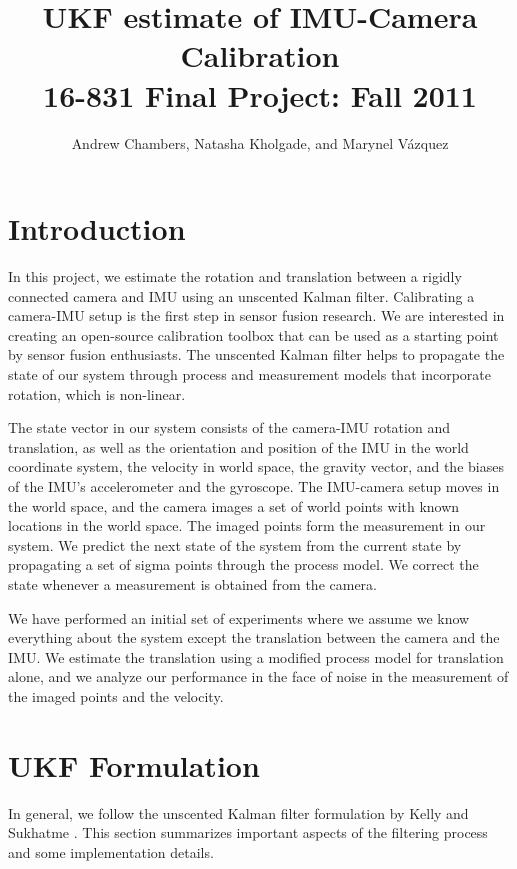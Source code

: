 \documentclass[letterpaper]{article}
\title{
  UKF estimate of IMU-Camera Calibration\\
  \Large{16-831 Final Project: Fall 2011}
}
\author{Andrew Chambers, Natasha Kholgade, and Marynel V\'azquez}
\date{}
\begin{document}
\maketitle

\section{Introduction}

In this project, we estimate the rotation and translation between a rigidly connected camera and IMU using an unscented Kalman filter. Calibrating a camera-IMU setup is the first step in sensor fusion research. We are interested in creating an open-source calibration toolbox that can be used as a starting point by sensor fusion enthusiasts. The unscented Kalman filter helps to propagate the state of our system through process and measurement models that incorporate rotation, which is non-linear.

The state vector in our system consists of the camera-IMU rotation and translation, as well as the orientation and position of the IMU in the world coordinate system, the velocity in world space, the gravity vector, and the biases of the IMU's accelerometer and the gyroscope. The IMU-camera setup moves in the world space, and the camera images a set of world points with known locations in the world space. The imaged points form the measurement in our system. We predict the next state of the system from the current state by propagating a set of sigma points through the process model. We correct the state whenever a measurement is obtained from the camera.

We have performed an initial set of experiments where we assume we know everything about the system except the translation between the camera and the IMU. We estimate the translation using a modified process model for translation alone, and we analyze our performance in the face of noise in the measurement of the imaged points and the velocity.



\section{UKF Formulation}
\label{sec:UKF}

In general, we follow the unscented Kalman filter formulation by Kelly
and Sukhatme \cite{2011:kelly:article}. This section 
summarizes important aspects of the filtering process and some
implementation details.
\end{document}
